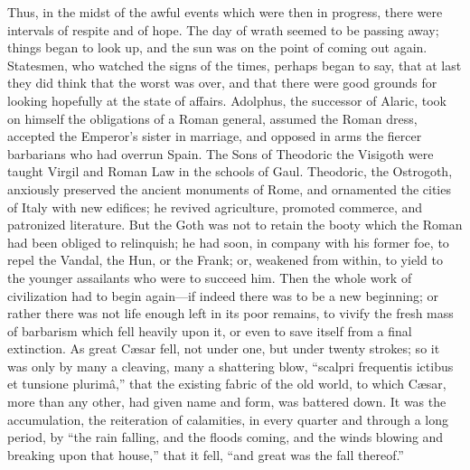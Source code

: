 Thus, in the midst of the awful events which were then in progress,
there were intervals of respite and of hope. The day of wrath seemed
to be passing away; things began to look up, and the sun was on the
point of coming out again. Statesmen, who watched the signs of the
times, perhaps began to say, that at last they did think that the
worst was over, and that there were good grounds for looking hopefully
at the state of affairs. Adolphus, the successor of Alaric, took on
himself the obligations of a Roman general, assumed the Roman dress,
accepted the Emperor's sister in marriage, and opposed in arms the
fiercer barbarians who had overrun Spain. The Sons of Theodoric the
Visigoth were taught Virgil and Roman Law in the schools of Gaul.
Theodoric, the Ostrogoth, anxiously preserved the ancient monuments of
Rome, and ornamented the cities of Italy with new edifices; he revived
agriculture, promoted commerce, and patronized literature. But the
Goth was not to retain the booty which the Roman had been
obliged to relinquish; he had soon, in company with his former foe, to
repel the Vandal, the Hun, or the Frank; or, weakened from within, to
yield to the younger assailants who were to succeed him. Then the
whole work of civilization had to begin again—if indeed there was to
be a new beginning; or rather there was not life enough left in its
poor remains, to vivify the fresh mass of barbarism which fell heavily
upon it, or even to save itself from a final extinction. As great
Cæsar fell, not under one, but under twenty strokes; so it was only
by many a cleaving, many a shattering blow, ``scalpri frequentis
ictibus et tunsione plurimâ,'' that the existing fabric of the
old world, to which Cæsar, more than any other, had given name and
form, was battered down. It was the accumulation, the reiteration of
calamities, in every quarter and through a long period, by ``the
rain falling, and the floods coming, and the winds blowing and
breaking upon that house,'' that it fell, ``and great was the
fall thereof.''

